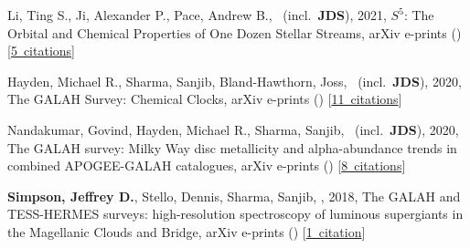\item[{\color{numcolor}\scriptsize4}] Li, Ting S., Ji, Alexander P., Pace, Andrew B., \etal\ (incl.\ \textbf{JDS}), 2021, $S^5$: The Orbital and Chemical Properties of One Dozen Stellar Streams, arXiv e-prints () [\href{https://ui.adsabs.harvard.edu/#abs/2021arXiv211006950L}{5~citations}]

\item[{\color{numcolor}\scriptsize3}] Hayden, Michael R., Sharma, Sanjib, Bland-Hawthorn, Joss, \etal\ (incl.\ \textbf{JDS}), 2020, The GALAH Survey: Chemical Clocks, arXiv e-prints () [\href{https://ui.adsabs.harvard.edu/#abs/2020arXiv201113745H}{11~citations}]

\item[{\color{numcolor}\scriptsize2}] Nandakumar, Govind, Hayden, Michael R., Sharma, Sanjib, \etal\ (incl.\ \textbf{JDS}), 2020, The GALAH survey: Milky Way disc metallicity and alpha-abundance trends in combined APOGEE-GALAH catalogues, arXiv e-prints () [\href{https://ui.adsabs.harvard.edu/#abs/2020arXiv201102783N}{8~citations}]

\item[{\color{numcolor}\scriptsize1}] \textbf{Simpson, Jeffrey D.}, Stello, Dennis, Sharma, Sanjib, \etal, 2018, The GALAH and TESS-HERMES surveys: high-resolution spectroscopy of luminous supergiants in the Magellanic Clouds and Bridge, arXiv e-prints () [\href{https://ui.adsabs.harvard.edu/#abs/2018arXiv180405900S}{1~citation}]
